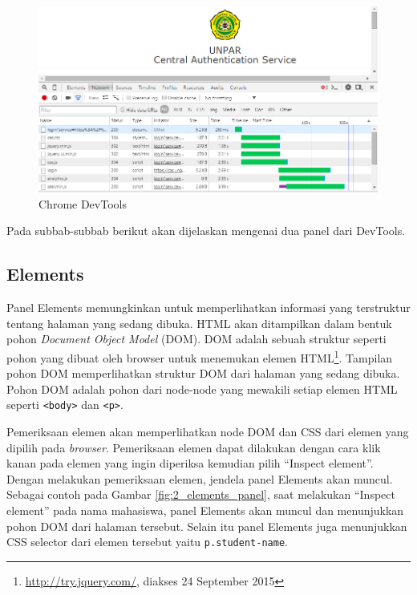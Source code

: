 \begin{figure}[H]
	\centering
	\includegraphics[scale=0.5]{Gambar/chrome-devtools}
	\caption{Chrome DevTools} 
	\label{fig:2_chrome_devtools}
\end{figure}

Pada subbab-subbab berikut akan dijelaskan mengenai dua panel dari DevTools.

\subsection{Elements}
Panel Elements memungkinkan untuk memperlihatkan informasi yang terstruktur tentang halaman yang sedang dibuka. HTML akan ditampilkan dalam bentuk pohon \textit{Document Object Model} (DOM). DOM adalah sebuah struktur seperti pohon yang dibuat oleh browser untuk menemukan elemen HTML\footnote{\url{http://try.jquery.com/}, diakses 24 September 2015}. Tampilan pohon DOM memperlihatkan struktur DOM dari halaman yang sedang dibuka. Pohon DOM adalah pohon dari node-node yang mewakili setiap elemen HTML seperti \texttt{<body>} dan \texttt{<p>}. 

Pemeriksaan elemen akan memperlihatkan node DOM dan CSS dari elemen yang dipilih pada \textit{browser}. Pemeriksaan elemen dapat dilakukan dengan cara klik kanan pada elemen yang ingin diperiksa kemudian pilih ``Inspect element''. Dengan melakukan pemeriksaan elemen, jendela panel Elements akan muncul. Sebagai contoh pada Gambar \ref{fig:2_elements_panel}, saat melakukan ``Inspect element'' pada nama mahasiswa, panel Elements akan muncul dan menunjukkan pohon DOM dari halaman tersebut. Selain itu panel Elements juga menunjukkan CSS selector dari elemen tersebut yaitu \texttt{p.student-name}.


